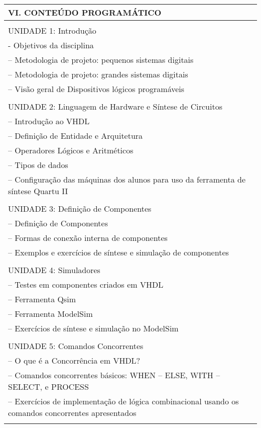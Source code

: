 \documentclass[12pt]{article}
\begin{document}
\begin{longtable}{|L{1.025\textwidth}|} \hline
%
{\bf VI. CONTEÚDO PROGRAMÁTICO } \\ \hline
 \\
 
UNIDADE 1: Introdução\\
- Objetivos da disciplina\\
– Metodologia de projeto: pequenos sistemas digitais\\
– Metodologia de projeto: grandes sistemas digitais\\
– Visão geral de Dispositivos lógicos programáveis\\
\\

UNIDADE 2: Linguagem de Hardware e Síntese de Circuitos \\
– Introdução ao VHDL\\
– Definição de Entidade e Arquitetura\\
– Operadores Lógicos e Aritméticos\\
– Tipos de dados\\
– Configuração das máquinas dos alunos para uso da ferramenta de síntese Quartu II\\
\\

UNIDADE 3: Definição de Componentes \\
– Definição de Componentes\\
– Formas de conexão interna de componentes\\
– Exemplos e exercícios de síntese e simulação de componentes\\
\\

UNIDADE 4: Simuladores \\
– Testes em componentes criados em VHDL\\
– Ferramenta Qsim\\
– Ferramenta ModelSim\\
– Exercícios de síntese e simulação no ModelSim\\
\\

UNIDADE 5: Comandos Concorrentes\\
– O que é a Concorrência em VHDL?\\
– Comandos concorrentes básicos: WHEN – ELSE, WITH – SELECT, e PROCESS\\
– Exercícios de implementação de lógica combinacional usando os comandos concorrentes apresentados\\
\\


\end{longtable}
\end{document}
